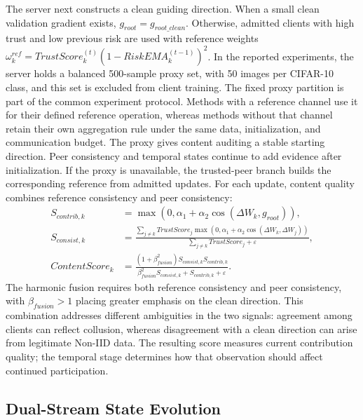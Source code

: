 \documentclass[runningheads,orivec]{llncs}
\begin{document}
The server next constructs a clean guiding direction. When a small clean validation gradient exists, $g_{root}=g_{root\_clean}$. Otherwise, admitted clients with high trust and low previous risk are used with reference weights $\omega_k^{ref}=TrustScore_k^{(t)}(1-RiskEMA_k^{(t-1)})^2$. In the reported experiments, the server holds a balanced 500-sample proxy set, with 50 images per CIFAR-10 class, and this set is excluded from client training. The fixed proxy partition is part of the common experiment protocol. Methods with a reference channel use it for their defined reference operation, whereas methods without that channel retain their own aggregation rule under the same data, initialization, and communication budget. The proxy gives content auditing a stable starting direction. Peer consistency and temporal states continue to add evidence after initialization. If the proxy is unavailable, the trusted-peer branch builds the corresponding reference from admitted updates. For each update, content quality combines reference consistency and peer consistency:
\begin{align}
    S_{contrib,k}  & =\max(0,\alpha_1+\alpha_2\cos(\Delta W_k,g_{root})),                                  \\
    S_{consist,k}  & =\frac{\sum_{j\ne k}TrustScore_j\max(0,\alpha_1+\alpha_2\cos(\Delta W_k,\Delta W_j))}
    {\sum_{j\ne k}TrustScore_j+\varepsilon},                                                               \\
    ContentScore_k & =\frac{(1+\beta_{fusion}^2)S_{consist,k}S_{contrib,k}}
    {\beta_{fusion}^2S_{consist,k}+S_{contrib,k}+\varepsilon}.
\end{align}
The harmonic fusion requires both reference consistency and peer consistency, with $\beta_{fusion}>1$ placing greater emphasis on the clean direction. This combination addresses different ambiguities in the two signals: agreement among clients can reflect collusion, whereas disagreement with a clean direction can arise from legitimate Non-IID data. The resulting score measures current contribution quality; the temporal stage determines how that observation should affect continued participation.

\subsection{Dual-Stream State Evolution}
\end{document}
